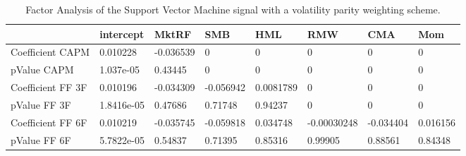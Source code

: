 \begin{table}[H]
\centering
\begin{tabular}{llllllll}
& intercept & MktRF & SMB & HML & RMW & CMA & Mom \\ 
\hline 
Coefficient CAPM & 0.010228 & -0.036539 & 0 & 0 & 0 & 0 & 0 \\ 
pValue CAPM & 1.037e-05 & 0.43445 & 0 & 0 & 0 & 0 & 0 \\ 
Coefficient FF 3F & 0.010196 & -0.034309 & -0.056942 & 0.0081789 & 0 & 0 & 0 \\ 
pValue FF 3F & 1.8416e-05 & 0.47686 & 0.71748 & 0.94237 & 0 & 0 & 0 \\ 
Coefficient FF 6F & 0.010219 & -0.035745 & -0.059818 & 0.034748 & -0.00030248 & -0.034404 & 0.016156 \\ 
pValue FF 6F & 5.7822e-05 & 0.54837 & 0.71395 & 0.85316 & 0.99905 & 0.88561 & 0.84348 \\ 
\hline
\end{tabular}
\caption{Factor Analysis of the Support Vector Machine signal with a volatility parity weighting scheme.}
\label{SVM_MODEL_FACTOR}
\end{table}